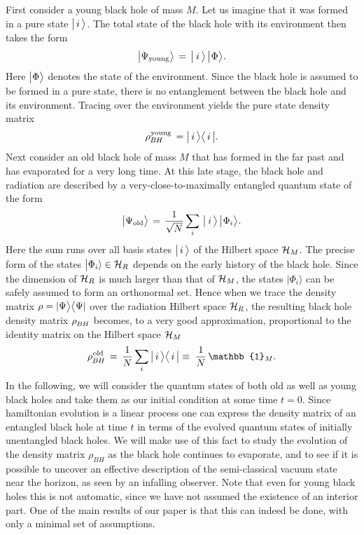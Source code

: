 \documentclass[12pt]{article}%
\def\spc{\hspace{.5pt}}
\def\be{\begin{equation}}
\def\ee{\end{equation}}
\begin{document}
First consider a young black hole of mass $M$. Let us imagine that it was formed in a pure state $\bigl |\, i\, \bigr\rangle$. The total state of the black hole
with its environment then takes the form
\be
\label{initialy}
\bigll|\Psi_{\rm young} \bigrr\rangle \, =\, \bigll|\spc \, \iii\, \bigrr\rangle
\,\bigll|\spc   \Phi\bigrr \rangle_\eE .
\ee
Here $\bigl|\Phi\bigr\rangle$ denotes the state of the environment. Since the black hole is assumed to be formed in a pure state, there is no entanglement 
between the black hole and its environment.
Tracing over the environment yields the pure state density matrix 
\be
\label{young}
\rho^{\spc \rm young}_\BH \,
=  \bigll |\, i\, \ra \la \,i \,\bigrr|.
\ee
Next consider an old black hole of mass $M$ that has formed in the far past and has evaporated for a very long time. At this late stage, the black hole and radiation are described by a very-close-to-maximally entangled quantum state of the form
\be
\label{initial}
\bigll|\Psi_{\rm old} \bigrr\rangle\, =\, \frac{1}{\sqrt{N}} 
\sum_{\iii} \ \bigll|\spc \, \iii\, \bigrr\rangle
\,\bigll|\spc   \Phi_\iii \bigrr \rangle_\eE .
\ee
Here the sum runs over all basis states $\bigl|\,i\,\bigr\rangle$ of the Hilbert space ${\cal H}_{M}$. 
The precise form of the states $\bigl|\Phi_i\rangle \in {\cal H}_R$ depends on the early history of the black hole. 
Since the dimension of ${\cal H}_{R}$ is much larger than that of ${\cal H}_{M}$, the states  $\bigl|\Phi_i\rangle$ can be safely assumed to form an orthonormal set. Hence when we trace the density matrix $\rho = |\Psi\bigr\rangle \bigl\langle  \Psi|$ over the radiation Hilbert space ${\cal H}_{R}$, the resulting black hole density matrix $\rho_\BH$  becomes, to a very good approximation,  proportional to the identity matrix on the Hilbert space ${\cal H}_{M}$ 
\be
\label{maxmix}
\rho^{\spc \rm old}_\BH \,
= \, \oneoverN %
\sum_{\iii}\,\bigll |\,\iii\, \ra \la \,\iii\,\bigrr|
\equiv\; \oneoverN \, \mathbb{1}_{M} .
\ee
In the following, we will consider the quantum states of both old as well as young black holes and take them as our initial condition at some time $t=0$. 
Since hamiltonian evolution is a linear process one can express the density matrix of an entangled black hole at time $t$ in terms of the evolved quantum states of initially unentangled black holes. We will make use of this fact to study the evolution of the density matrix $\rho_{BH}$ as the black hole continues to evaporate, and to see if it is possible to uncover an effective description of the semi-classical vacuum state near the horizon, as seen by an infalling observer. Note that even for young black holes this is not automatic, since we have not assumed the existence of an interior part. One of the main results of our paper is that this can indeed be done, with only a minimal set of assumptions. 
\end{document}
